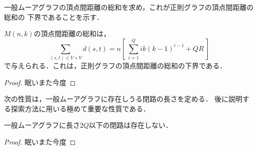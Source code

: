 一般ムーアグラフの頂点間距離の総和を求め，これが正則グラフの頂点間距離の総和の
下界であることを示す．
\begin{theorem}
  \label{theorem:gmg-lower-bound}
  $M(n,k)$の頂点間距離の総和は，
  \[\sum_{(s,t)\in V\times V}d(s,t) =
  n \left[\ \sum^{Q}_{i=1}ik(k-1)^{i-1} + QR\ \right] \]
  で与えられる．これは，正則グラフの頂点間距離の総和の下界である．
\end{theorem}
\begin{proof}
  眠いまた今度
\end{proof}

次の性質は，一般ムーアグラフに存在しうる閉路の長さを定める．
後に説明する探索方法に用いる極めて重要な性質である．
\begin{theorem}
  \label{theorem:gmg-geometric-property}
  一般ムーアグラフに長さ$2Q$以下の閉路は存在しない．

\end{theorem}
\begin{proof}
  眠いまた今度
\end{proof}

